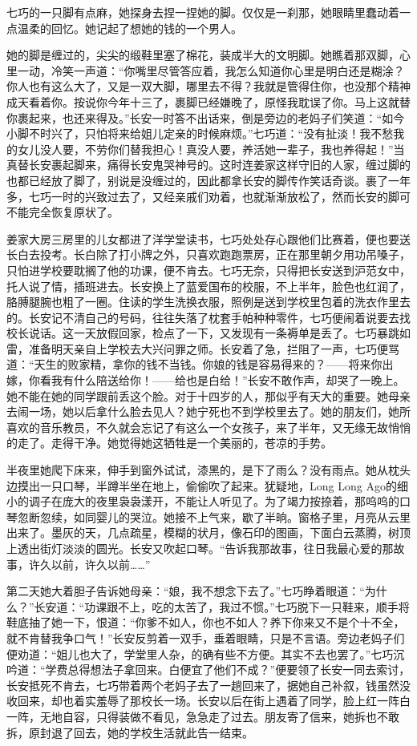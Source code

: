 \par 七巧的一只脚有点麻，她探身去捏一捏她的脚。仅仅是一刹那，她眼睛里蠢动着一点温柔的回忆。她记起了想她的钱的一个男人。
\par 她的脚是缠过的，尖尖的缎鞋里塞了棉花，装成半大的文明脚。她瞧着那双脚，心里一动，冷笑一声道：“你嘴里尽管答应着，我怎么知道你心里是明白还是糊涂？你人也有这么大了，又是一双大脚，哪里去不得？我就是管得住你，也没那个精神成天看着你。按说你今年十三了，裹脚已经嫌晚了，原怪我耽误了你。马上这就替你裹起来，也还来得及。”长安一时答不出话来，倒是旁边的老妈子们笑道：“如今小脚不时兴了，只怕将来给姐儿定亲的时候麻烦。”七巧道：“没有扯淡！我不愁我的女儿没人要，不劳你们替我担心！真没人要，养活她一辈子，我也养得起！”当真替长安裹起脚来，痛得长安鬼哭神号的。这时连姜家这样守旧的人家，缠过脚的也都已经放了脚了，别说是没缠过的，因此都拿长安的脚传作笑话奇谈。裹了一年多，七巧一时的兴致过去了，又经亲戚们劝着，也就渐渐放松了，然而长安的脚可不能完全恢复原状了。
\par 姜家大房三房里的儿女都进了洋学堂读书，七巧处处存心跟他们比赛着，便也要送长白去投考。长白除了打小牌之外，只喜欢跑跑票房，正在那里朝夕用功吊嗓子，只怕进学校要耽搁了他的功课，便不肯去。七巧无奈，只得把长安送到沪范女中，托人说了情，插班进去。长安换上了蓝爱国布的校服，不上半年，脸色也红润了，胳膊腿腕也粗了一圈。住读的学生洗换衣服，照例是送到学校里包着的洗衣作里去的。长安记不清自己的号码，往往失落了枕套手帕种种零件，七巧便闹着说要去找校长说话。这一天放假回家，检点了一下，又发现有一条褥单是丢了。七巧暴跳如雷，准备明天亲自上学校去大兴问罪之师。长安着了急，拦阻了一声，七巧便骂道：“天生的败家精，拿你的钱不当钱。你娘的钱是容易得来的？——将来你出嫁，你看我有什么陪送给你！——给也是白给！”长安不敢作声，却哭了一晚上。她不能在她的同学跟前丢这个脸。对于十四岁的人，那似乎有天大的重要。她母亲去闹一场，她以后拿什么脸去见人？她宁死也不到学校里去了。她的朋友们，她所喜欢的音乐教员，不久就会忘记了有这么一个女孩子，来了半年，又无缘无故悄悄的走了。走得干净。她觉得她这牺牲是一个美丽的，苍凉的手势。
\par 半夜里她爬下床来，伸手到窗外试试，漆黑的，是下了雨么？没有雨点。她从枕头边摸出一只口琴，半蹲半坐在地上，偷偷吹了起来。犹疑地，Long Long Ago的细小的调子在庞大的夜里袅袅漾开，不能让人听见了。为了竭力按捺着，那呜呜的口琴忽断忽续，如同婴儿的哭泣。她接不上气来，歇了半晌。窗格子里，月亮从云里出来了。墨灰的天，几点疏星，模糊的状月，像石印的图画，下面白云蒸腾，树顶上透出街灯淡淡的圆光。长安又吹起口琴。“告诉我那故事，往日我最心爱的那故事，许久以前，许久以前……”
\par 第二天她大着胆子告诉她母亲：“娘，我不想念下去了。”七巧睁着眼道：“为什么？”长安道：“功课跟不上，吃的太苦了，我过不惯。”七巧脱下一只鞋来，顺手将鞋底抽了她一下，恨道：“你爹不如人，你也不如人？养下你来又不是个十不全，就不肯替我争口气！”长安反剪着一双手，垂着眼睛，只是不言语。旁边老妈子们便劝道：“姐儿也大了，学堂里人杂，的确有些不方便。其实不去也罢了。”七巧沉吟道：“学费总得想法子拿回来。白便宜了他们不成？”便要领了长安一同去索讨，长安抵死不肯去，七巧带着两个老妈子去了一趟回来了，据她自己补叙，钱虽然没收回来，却也着实羞辱了那校长一场。长安以后在街上遇着了同学，脸上红一阵白一阵，无地自容，只得装做不看见，急急走了过去。朋友寄了信来，她拆也不敢拆，原封退了回去，她的学校生活就此告一结束。
